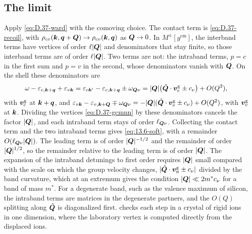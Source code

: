 \subsection*{The limit}

Apply \cref{eq:D.37-ward} with the comoving choice. The contact term is \cref{eq:D.37-recoil}, with $\rho_{cv}(\bm{k},\bm{q}+\bm{Q}) \to \rho_{cv}(\bm{k},\bm{q})$ as $\bm{Q}\to0$. In $M^\pm[g^{\mathrm{cm}}]$, the interband terms have vertices of order $\ell|\bm{Q}|$ and denominators that stay finite, so those interband terms are of order $\ell|\bm{Q}|$. Two terms are not: the intraband terms, $p = c$ in the first sum and $p = v$ in the second, whose denominators vanish with $\bm{Q}$. On the shell these denominators are
\begin{equation*}
  \omega - \varepsilon_{c,\bm{k}+\bm{q}} + \varepsilon_{v\bm{k}} = \varepsilon_{c\bm{k}'} - \varepsilon_{c,\bm{k}+\bm{q}} \pm \omega_{\bm{Q}\nu} = |\bm{Q}|\bigl(\hat{\bm{Q}}\cdot\bm{v}^{\mathrm{g}}_c \pm c_\nu\bigr) + O(Q^2) ,
\end{equation*}
with $\bm{v}^{\mathrm{g}}_c$ at $\bm{k}+\bm{q}$, and $\varepsilon_{v\bm{k}} - \varepsilon_{v,\bm{k}+\bm{Q}} \mp \omega_{\bm{Q}\nu} = -|\bm{Q}|(\hat{\bm{Q}}\cdot\bm{v}^{\mathrm{g}}_v \pm c_\nu) + O(Q^2)$, with $\bm{v}^{\mathrm{g}}_v$ at $\bm{k}$. Dividing the vertices \cref{eq:D.37-gcmnn} by these denominators cancels the factor $|\bm{Q}|$, and each intraband term stays of order $\ell_{\bm{Q}\nu}$. Collecting the contact term and the two intraband terms gives \cref{eq:13.6-soft}, with a remainder $O(\ell_{\bm{Q}\nu}|\bm{Q}|)$. The leading term is of order $|\bm{Q}|^{-1/2}$ and the remainder of order $|\bm{Q}|^{1/2}$, so the remainder relative to the leading term is of order $|\bm{Q}|$. The expansion of the intraband detunings to first order requires $|\bm{Q}|$ small compared with the scale on which the group velocity changes, $|\hat{\bm{Q}}\cdot\bm{v}^{\mathrm{g}}_n \pm c_\nu|$ divided by the band curvature, which at an extremum gives the condition $|\bm{Q}| \ll 2m^*c_\nu$ for a band of mass $m^*$. For a degenerate band, such as the valence maximum of silicon, the intraband terms are matrices in the degenerate partners, and the $O(Q)$ splitting along $\hat{\bm{Q}}$ is diagonalized first.  checks each step in a crystal of rigid ions in one dimension, where the laboratory vertex is computed directly from the displaced ions.

